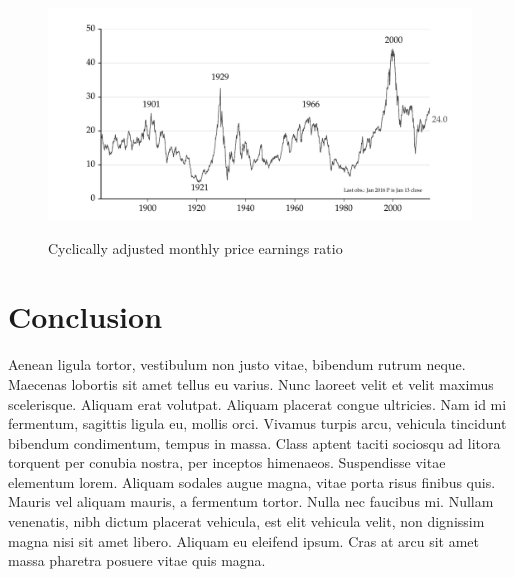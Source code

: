 \documentclass[11pt,a4paper]{article}
\begin{document}
\begin{figure}
\caption{Cyclically adjusted monthly price earnings ratio}
	\centering
	\includegraphics[trim=0cm 0cm 0cm 0cm, clip=true, totalheight=0.3\textheight]{figures/pe_ratio}
	\label{fig:shiller_pe}
\end{figure}

\section{Conclusion}

Aenean ligula tortor, vestibulum non justo vitae, bibendum rutrum neque. Maecenas lobortis sit amet tellus eu varius. Nunc laoreet velit et velit maximus scelerisque. Aliquam erat volutpat. Aliquam placerat congue ultricies. Nam id mi fermentum, sagittis ligula eu, mollis orci. Vivamus turpis arcu, vehicula tincidunt bibendum condimentum, tempus in massa. Class aptent taciti sociosqu ad litora torquent per conubia nostra, per inceptos himenaeos. Suspendisse vitae elementum lorem. Aliquam sodales augue magna, vitae porta risus finibus quis. Mauris vel aliquam mauris, a fermentum tortor. Nulla nec faucibus mi. Nullam venenatis, nibh dictum placerat vehicula, est elit vehicula velit, non dignissim magna nisi sit amet libero. Aliquam eu eleifend ipsum. Cras at arcu sit amet massa pharetra posuere vitae quis magna.







\end{document}
